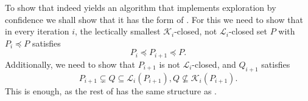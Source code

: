 To show that  indeed yields
an algorithm that implements exploration by confidence we shall show that it has the form
of .  For this we need to show that in every
iteration $i$, the lectically smallest $\mathcal{K}_{i}$-closed, not
$\mathcal{L}_{i}$-closed set $P$ with $P_{i} \preceq P$ satisfies
\begin{equation}
  \label{eq:46}
  P_{i} \preceq P_{i+1} \preceq P.
\end{equation}
Additionally, we need to show that $P_{i+1}$ is not $\mathcal{L}_{i}$-closed, and
$Q_{i+1}$ satisfies
\begin{equation}
  \label{eq:47}
  P_{i+1} \subsetneq Q \subseteq \mathcal{L}_{i}(P_{i+1}), Q \not\subseteq \mathcal{K}_{i}(P_{i+1}).
\end{equation}
This is enough, as the rest of
 has the same structure as
.

